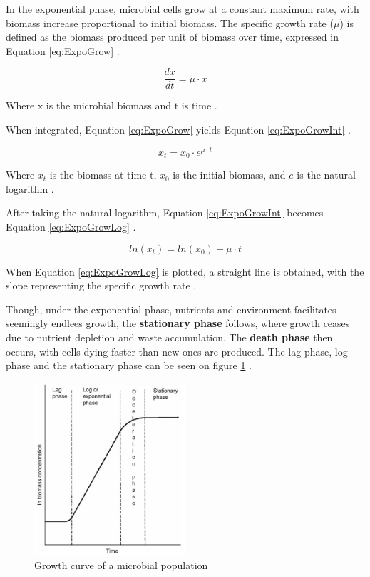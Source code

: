 In the exponential phase, microbial cells grow at a constant maximum rate, with biomass increase proportional to initial biomass. The specific growth rate ($\mu$) is defined as the biomass produced per unit of biomass over time, expressed in Equation \ref*{eq:ExpoGrow} \cite*{L11-MicroGrow}.

\begin{equation}
    \frac{dx}{dt} = \mu\cdot x 
    \label{eq:ExpoGrow}
\end{equation}

Where x is the microbial biomass and t is time \cite*{L11-MicroGrow}.

When integrated, Equation \ref*{eq:ExpoGrow} yields Equation \ref*{eq:ExpoGrowInt} \cite*{L11-MicroGrow}.

\begin{equation}
    x_t = x_0\cdot e^{\mu\cdot t}
    \label{eq:ExpoGrowInt}
\end{equation}
    
Where $x_t$ is the biomass at time t, $x_0$ is the initial biomass, and \( e \) is the natural logarithm \cite*{L11-MicroGrow}.

After taking the natural logarithm, Equation \ref*{eq:ExpoGrowInt} becomes Equation \ref*{eq:ExpoGrowLog} \cite*{L11-MicroGrow}.

\begin{equation}
    ln(x_t) = ln(x_0) + \mu\cdot t
    \label{eq:ExpoGrowLog}
\end{equation}

When Equation \ref*{eq:ExpoGrowLog} is plotted, a straight line is obtained, with the slope representing the specific growth rate \cite*{L11-MicroGrow}.

Though, under the exponential phase, nutrients and environment facilitates seemingly endlees growth, the \textbf{stationary phase} follows, where growth ceases due to nutrient depletion and waste accumulation. The \textbf{death phase} then occurs, with cells dying faster than new ones are produced. The lag phase, log phase and the stationary phase can be seen on figure \ref*{fig:LogPhase} \cite*{L11-MicroGrow}.

\begin{figure}[h]
    \centering
    \includegraphics[width=0.5\textwidth]{Figures/L11A1-s_graph.JPG}
    \caption{Growth curve of a microbial population \cite*{L11-MicroGrow}}
    \label{fig:LogPhase}
\end{figure}

